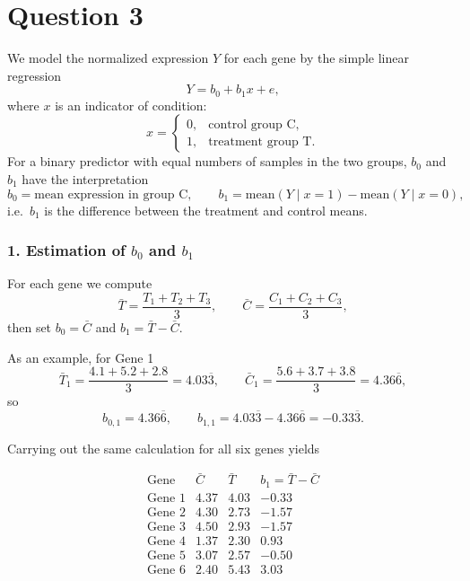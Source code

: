 \section*{Question 3}

We model the normalized expression $Y$ for each gene by the simple linear
regression
\[
    Y = b_0 + b_1 x + e ,
\]
where $x$ is an indicator of condition:
\[
    x =
    \begin{cases}
        0, & \text{control group C},   \\
        1, & \text{treatment group T}.
    \end{cases}
\]
For a binary predictor with equal numbers of samples in the two groups,
$b_0$ and $b_1$ have the interpretation
\[
    b_0 = \text{mean expression in group C}, \qquad
    b_1 = \text{mean}(Y\mid x=1) - \text{mean}(Y\mid x=0),
\]
i.e.\ $b_1$ is the difference between the treatment and control means.

\subsubsection*{1. Estimation of $b_0$ and $b_1$}

For each gene we compute
\[
    \bar{T} = \frac{T_1+T_2+T_3}{3}, \qquad
    \bar{C} = \frac{C_1+C_2+C_3}{3},
\]
then set $b_0 = \bar{C}$ and $b_1 = \bar{T}-\bar{C}$.

As an example, for Gene 1
\[
    \bar{T}_1 = \frac{4.1+5.2+2.8}{3} = 4.03\overline{3}, \qquad
    \bar{C}_1 = \frac{5.6+3.7+3.8}{3} = 4.36\overline{6},
\]
so
\[
    b_{0,1} = 4.36\overline{6}, \qquad
    b_{1,1} = 4.03\overline{3} - 4.36\overline{6} = -0.33\overline{3}.
\]

Carrying out the same calculation for all six genes yields

\[
    \begin{array}{c|ccc}
        \text{Gene}   & \bar{C} & \bar{T} & b_1 = \bar{T}-\bar{C} \\ \hline
        \text{Gene 1} & 4.37    & 4.03    & -0.33                 \\
        \text{Gene 2} & 4.30    & 2.73    & -1.57                 \\
        \text{Gene 3} & 4.50    & 2.93    & -1.57                 \\
        \text{Gene 4} & 1.37    & 2.30    & 0.93                  \\
        \text{Gene 5} & 3.07    & 2.57    & -0.50                 \\
        \text{Gene 6} & 2.40    & 5.43    & 3.03
    \end{array}
\]

